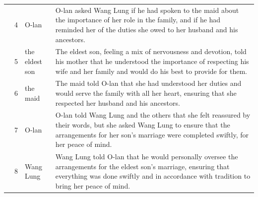 \begin{tabular}{llp{1.8cm}p{9.0cm}}
 & 4 & O-lan & O-lan asked Wang Lung if he had spoken to the maid about the importance of her role in the family, and if he had reminded her of the duties she owed to her husband and his ancestors. \\
 & 5 & the eldest son & The eldest son, feeling a mix of nervousness and devotion, told his mother that he understood the importance of respecting his wife and her family and would do his best to provide for them. \\
 & 6 & the maid & The maid told O-lan that she had understood her duties and would serve the family with all her heart, ensuring that she respected her husband and his ancestors. \\
 & 7 & O-lan & O-lan told Wang Lung and the others that she felt reassured by their words, but she asked Wang Lung to ensure that the arrangements for her son’s marriage were completed swiftly, for her peace of mind. \\
 & 8 & Wang Lung & Wang Lung told O-lan that he would personally oversee the arrangements for the eldest son’s marriage, ensuring that everything was done swiftly and in accordance with tradition to bring her peace of mind. \\
\bottomrule
\end{tabular}
